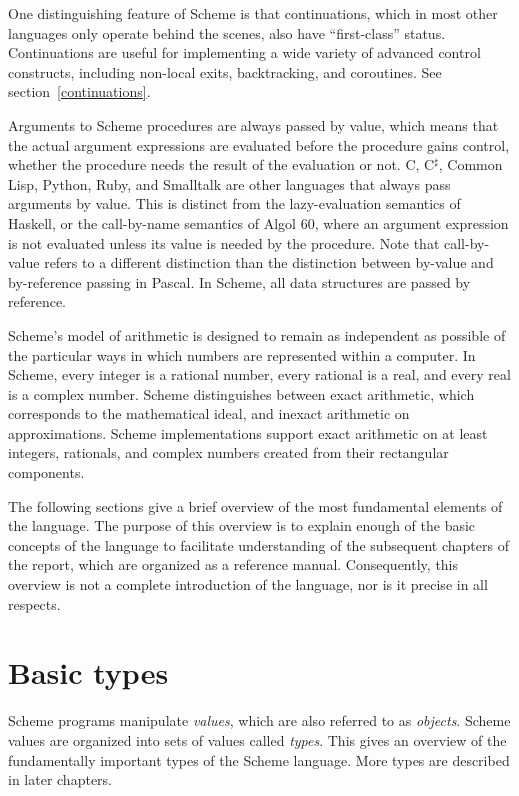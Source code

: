 \vest One distinguishing feature of Scheme is that continuations, which
in most other languages only operate behind the scenes, also have
``first-class'' status.  Continuations are useful for implementing a
wide variety of advanced control constructs, including non-local exits,
backtracking, and coroutines.  See section~\ref{continuations}.

\vest Arguments to Scheme procedures are always passed by value, which
means that the actual argument expressions are evaluated before the
procedure gains control, whether the procedure needs the result of the
evaluation or not.  C, C$^\sharp$, Common Lisp, Python, Ruby, and Smalltalk
are other languages that always pass arguments by value.  This is
distinct from the lazy-evaluation semantics of Haskell, or the
call-by-name semantics of Algol 60, where an argument expression is
not evaluated unless its value is needed by the procedure.  Note that
call-by-value refers to a different distinction than the distinction
between by-value and by-reference passing in Pascal.  In Scheme, all
data structures are passed by reference.

\vest Scheme's model of arithmetic is designed to remain as
independent as possible of the particular ways in which numbers are
represented within a computer. In Scheme, every integer is a rational
number, every rational is a real, and every real is a complex number.
Scheme distinguishes between exact arithmetic, which corresponds to
the mathematical ideal, and inexact arithmetic on approximations.
Scheme implementations support exact arithmetic on at least integers,
rationals, and complex numbers created from their rectangular components.

The following sections give a brief overview of the most fundamental
elements of the language.  The purpose of this overview is to explain
enough of the basic concepts of the language to facilitate
understanding of the subsequent chapters of the report, which are
organized as a reference manual.  Consequently, this overview is
not a complete introduction of the language, nor is it precise
in all respects.

\section{Basic types}

Scheme programs manipulate \textit{values}, which are also referred
to as \textit{objects}.
Scheme values are organized into sets of values called \textit{types}.
This gives an overview of the fundamentally important types of the
Scheme language.  More types are described in later chapters.

